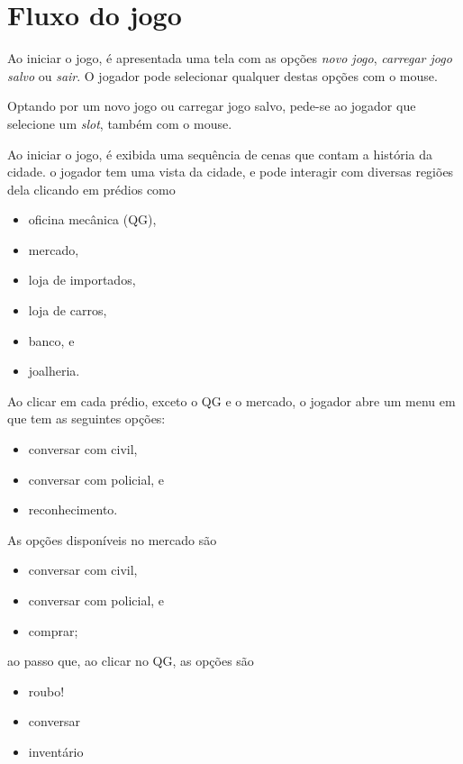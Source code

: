 \section{Fluxo do jogo}

Ao iniciar o jogo, é apresentada uma tela com as opções \emph{novo jogo}, \emph{carregar jogo salvo} ou \emph{sair}. O jogador pode selecionar qualquer destas opções com o mouse.

Optando por um novo jogo ou carregar jogo salvo, pede-se ao jogador que selecione um \emph{slot}, também com o mouse.

Ao iniciar o jogo, é exibida uma sequência de cenas que contam a história da cidade. o jogador tem uma vista da cidade, e pode interagir com diversas regiões dela clicando em prédios como
\begin{itemize}
\item oficina mecânica (QG),
\item mercado,
\item loja de importados,
\item loja de carros,
\item banco, e
\item joalheria.
\end{itemize}

Ao clicar em cada prédio, exceto o QG e o mercado, o jogador abre um menu em que tem as seguintes opções:
\begin{itemize}
\item conversar com civil,
\item conversar com policial, e
\item reconhecimento.
\end{itemize}

As opções disponíveis no mercado são
\begin{itemize}
\item conversar com civil,
\item conversar com policial, e
\item comprar;
\end{itemize}
ao passo que, ao clicar no QG, as opções são
\begin{itemize}
\item roubo!
\item conversar
\item inventário
\end{itemize}

